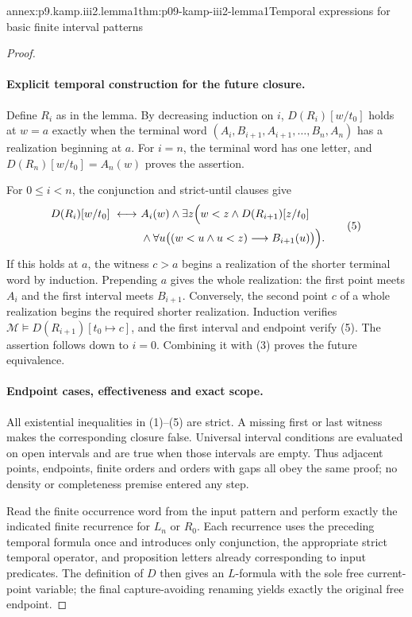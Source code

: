 \begin{annexitem}{annex:p9.kamp.iii2.lemma1}{thm:p09-kamp-iii2-lemma1}{Temporal expressions for basic finite interval patterns}
\begin{proof}
\paragraph{Explicit temporal construction for the future closure.}
Define \(R_i\) as in the lemma.  By decreasing induction on \(i\),
\(D(R_i)[w/t_0]\) holds at \(w=a\) exactly when the terminal word
\((A_i,B_{i+1},A_{i+1},\ldots,B_n,A_n)\) has a realization
beginning at \(a\).  For \(i=n\), the terminal word has one letter,
and \(D(R_n)[w/t_0]=A_n(w)\) proves the assertion.

For \(0\leq i<n\), the conjunction and strict-until clauses give
\[
\begin{split}
 D(R_i)[w/t_0]\ \longleftrightarrow\ 
 &A_i(w)\land\exists z\Bigl(w<z\land D(R_{i+1})[z/t_0]\\
 &{}\land\forall u\bigl((w<u\land u<z)
                         \longrightarrow B_{i+1}(u)\bigr)\Bigr).
\end{split}
\tag{5}
\]
If this holds at \(a\), the witness \(c>a\) begins a realization
of the shorter terminal word by induction.  Prepending \(a\) gives the
whole realization: the first point meets \(A_i\) and the first interval
meets \(B_{i+1}\).  Conversely, the second point \(c\) of a whole
realization begins the required shorter realization.  Induction verifies
\(\mathcal M\models D(R_{i+1})[t_0\mapsto c]\), and the first interval
and endpoint verify (5).
The assertion follows down to \(i=0\).  Combining it with (3) proves
the future equivalence.

\paragraph{Endpoint cases, effectiveness and exact scope.}
All existential inequalities in (1)--(5) are strict.  A missing first or
last witness makes the corresponding closure false.  Universal interval
conditions are evaluated on open intervals and are true when those
intervals are empty.  Thus adjacent points, endpoints, finite orders and
orders with gaps all obey the same proof; no density or completeness
premise entered any step.

Read the finite occurrence word from the input pattern and perform exactly
the indicated finite recurrence for \(L_n\) or \(R_0\).  Each recurrence
uses the preceding temporal formula once and introduces only conjunction,
the appropriate strict temporal operator, and proposition letters already
corresponding to input predicates.  The definition of \(D\) then gives
an \(L\)-formula with the sole free current-point variable; the final
capture-avoiding renaming yields exactly the original free endpoint.


\end{proof}
\end{annexitem}
